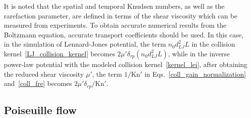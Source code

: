 It is noted that the spatial and temporal Knudsen numbers, as well as the rarefaction parameter, are defined in terms of the shear viscosity which can be measured from experiments. To obtain accurate numerical results from the Boltzmann equation, accurate transport coefficients should be used. In this case, in the simulation of Lennard-Jones potential, the term $n_0d_{LJ}^2L$ in the collision kernel~\eqref{LJ_collision_kernel} becomes
$2\mu'\delta_{rp}(n_0d_{LJ}^2L)$,
while in the inverse power-law potential with the modeled collision kernel~\eqref{kernel_lei}, after obtaining the reduced shear viscosity $\mu'$, the term $1/\text{Kn}'$ in Eqs.~\eqref{coll_gain_normalization} and~\eqref{coll_fre} becomes
${2\mu'\delta_{rp}}/{\text{Kn}'}$.






\subsection{Poiseuille flow}



%


